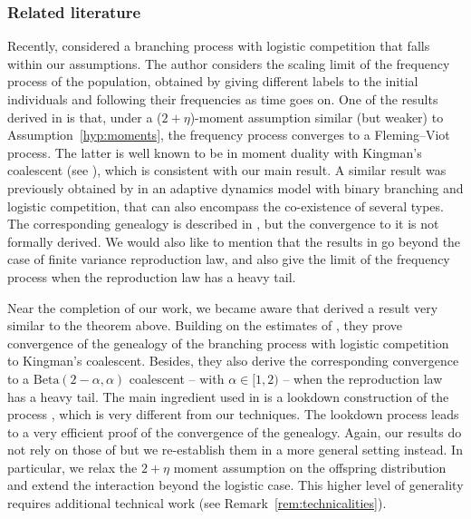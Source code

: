 \begin{refsegment}
\subsubsection*{Related literature}
Recently, \citet{forien2025} considered a branching process with logistic
competition that falls within our assumptions. The author considers the
scaling limit of the frequency process of the population, obtained by
giving different labels to the initial individuals and following their
frequencies as time goes on. One of the results derived in
\cite{forien2025} is that, under a ($2+\eta$)-moment assumption similar (but weaker) to
Assumption~\ref{hyp:moments}, the frequency process converges to a
Fleming--Viot process. The latter is well known to be in moment duality
with Kingman's coalescent (see \eg \cite{ethier_flemingviot_1993}), which
is consistent with our main result. 
A similar result was previously obtained by \citet*{billiard2015stochastic}
in an adaptive dynamics model with binary branching and logistic
competition, that can also encompass the co-existence of several types.
The corresponding genealogy is described in \citet*{lepers2021inference},
but the convergence to it is not formally derived.
We would also like to mention that the results in \cite{forien2025} go
beyond the case of finite variance reproduction law, and also give the
limit of the frequency process when the reproduction law has a heavy
tail.

Near the completion of our work, we became aware that \citet*{garrett2025}
derived a result very similar to the theorem above. Building on the
estimates of \cite{forien2025}, they prove convergence of the genealogy of
the branching process with logistic competition to Kingman's coalescent.
Besides, they also derive the corresponding convergence to a
$\mathrm{Beta}(2-\alpha, \alpha)$ coalescent -- with $\alpha \in [1,2)$ --
when the reproduction law has a heavy tail. The main ingredient used in 
\cite{garrett2025} is a lookdown construction of the process
\citep{donnelly1999particle}, which is very different from our techniques. The
lookdown process leads to a very efficient proof of the convergence of
the genealogy. 
Again, our results do not rely on those of \cite{forien2025} but we
re-establish them in a more general setting instead. In particular, we relax the
$2+\eta$ moment assumption on the offspring distribution and extend the
interaction beyond the logistic case. This higher level of generality
requires additional technical work (see Remark~\ref{rem:technicalities}).


\end{refsegment}
